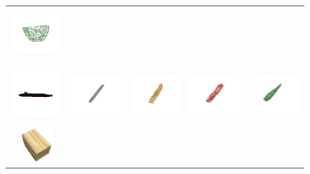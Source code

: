 \documentclass[bachelor, nocolorlinks, printoneside]{seuthesis} %
\begin{document}
\begin{Appendix}{}
\begin{figure}[!h]
\begin{tabular}{c@{}c@{}c@{}c@{}c@{}}
            \includegraphics[width=0.22\columnwidth,height=2cm]{figs/supp_real_dataset/oracle/pot_490e2e25da735cfd3df324363ca0723f_oracle.png} \\
            \vspace{-5mm}
            \includegraphics[width=0.11\columnwidth,height=1.7cm]{figs/supp_real_dataset/Image/rocket_99314b704285c0ca16e3314677399d49.png} &
            \includegraphics[width=0.22\columnwidth,height=2cm]{figs/supp_real_dataset/GT/rocket_99314b704285c0ca16e3314677399d49_gt.png} &
            \includegraphics[width=0.22\columnwidth,height=2cm]{figs/supp_real_dataset/AE_label/rocket_99314b704285c0ca16e3314677399d49_label.png} &
            \includegraphics[width=0.22\columnwidth,height=2cm]{figs/supp_real_dataset/AE/rocket_99314b704285c0ca16e3314677399d49_pred.png} &
            \includegraphics[width=0.22\columnwidth,height=2cm]{figs/supp_real_dataset/oracle/rocket_99314b704285c0ca16e3314677399d49_oracle.png} \\
            \vspace{-5mm}
            \includegraphics[width=0.11\columnwidth,height=1.3cm]{figs/supp_real_dataset/Image/table_3942f02501161134c3bd24f986301745.png} &

\end{tabular}
\end{figure}
\end{Appendix}
\end{document}

